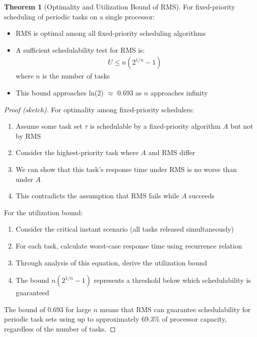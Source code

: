 \documentclass{article}
\theoremstyle{definition}
\newtheorem{theorem}{Theorem}
\begin{document}
\begin{theorem}[Optimality and Utilization Bound of RMS]
For fixed-priority scheduling of periodic tasks on a single processor:

\begin{itemize}
    \item RMS is optimal among all fixed-priority scheduling algorithms
    \item A sufficient schedulability test for RMS is:
    \begin{align}
    U \leq n(2^{1/n} - 1)
    \end{align}
    where $n$ is the number of tasks
    \item This bound approaches ln(2) $\approx$ 0.693 as $n$ approaches infinity
\end{itemize}

\begin{proof}[Proof (sketch)]
For optimality among fixed-priority schedulers:
\begin{enumerate}
    \item Assume some task set $\tau$ is schedulable by a fixed-priority algorithm $A$ but not by RMS
    \item Consider the highest-priority task where $A$ and RMS differ
    \item We can show that this task's response time under RMS is no worse than under $A$
    \item This contradicts the assumption that RMS fails while $A$ succeeds
\end{enumerate}

For the utilization bound:
\begin{enumerate}
    \item Consider the critical instant scenario (all tasks released simultaneously)
    \item For each task, calculate worst-case response time using recurrence relation
    \item Through analysis of this equation, derive the utilization bound
    \item The bound $n(2^{1/n} - 1)$ represents a threshold below which schedulability is guaranteed
\end{enumerate}

The bound of 0.693 for large $n$ means that RMS can guarantee schedulability for periodic task sets using up to approximately 69.3\% of processor capacity, regardless of the number of tasks.
\end{proof}
\end{theorem}
\end{document}
